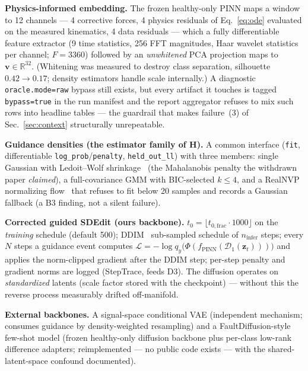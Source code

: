 \documentclass[11pt]{article}
\newcommand{\z}{\mathbf{z}}
\newcommand{\bv}{\mathbf{v}}
\newcommand{\Feat}{\Phi}
\newcommand{\PINN}{f_{\mathrm{PINN}}}
\newcommand{\code}[1]{\texttt{\small #1}}
\begin{document}
\textbf{Physics-informed embedding.} The frozen healthy-only PINN maps a
window to 12 channels --- 4 corrective forces, 4 physics residuals of
Eq.~\eqref{eq:ode} evaluated on the measured kinematics, 4 data residuals ---
which a fully differentiable feature extractor (9 time statistics, 256 FFT
magnitudes, Haar wavelet statistics per channel; $F=3360$) followed by an
\emph{unwhitened} PCA projection maps to $\bv\in\mathbb{R}^{32}$. (Whitening
was measured to destroy class separation, silhouette $0.42\!\to\!0.17$;
density estimators handle scale internally.) A diagnostic
\code{oracle.mode=raw} bypass still exists, but every artifact it touches is
tagged \code{bypass=true} in the run manifest and the report aggregator
refuses to mix such rows into headline tables --- the guardrail that makes
failure~(3) of Sec.~\ref{sec:context} structurally unrepeatable.

\textbf{Guidance densities (the estimator family of H).} A common interface
(\code{fit}, differentiable \code{log\_prob}/\code{penalty},
\code{held\_out\_ll}) with three members: single Gaussian with Ledoit--Wolf
shrinkage~\cite{ledoit2004well} (the Mahalanobis penalty the withdrawn paper
\emph{claimed}), a full-covariance GMM with BIC-selected $k\le 4$, and a
RealNVP normalizing flow~\cite{papamakarios2021normalizing} that refuses to
fit below 20 samples and records a Gaussian fallback (a B3 finding, not a
silent failure).

\textbf{Corrected guided SDEdit (ours backbone).}
$t_0 = \lfloor t_{0,\mathrm{frac}} \cdot 1000\rfloor$ on the \emph{training}
schedule (default 500); DDIM~\cite{song2021ddim} sub-sampled schedule of
$n_{\mathrm{infer}}$ steps; every $N$ steps a guidance event computes
$\mathcal{L} = -\log q_y\!\big(\Feat(\PINN(\mathcal{D}_1(\z_t)))\big)$ and
applies the norm-clipped gradient after the DDIM step; per-step penalty and
gradient norms are logged (StepTrace, feeds D3). The diffusion operates on
\emph{standardized} latents (scale factor stored with the checkpoint) ---
without this the reverse process measurably drifted off-manifold.

\textbf{External backbones.} A signal-space conditional VAE (independent
mechanism; consumes guidance by density-weighted resampling) and a
FaultDiffusion-style~\cite{xu2025faultdiffusion} few-shot model (frozen
healthy-only diffusion backbone plus per-class low-rank difference adapters;
reimplemented --- no public code exists --- with the shared-latent-space
confound documented).
\end{document}
